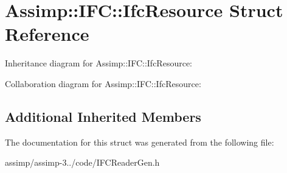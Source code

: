 \hypertarget{struct_assimp_1_1_i_f_c_1_1_ifc_resource}{\section{Assimp\+:\+:I\+F\+C\+:\+:Ifc\+Resource Struct Reference}
\label{struct_assimp_1_1_i_f_c_1_1_ifc_resource}
}


Inheritance diagram for Assimp\+:\+:I\+F\+C\+:\+:Ifc\+Resource\+:


Collaboration diagram for Assimp\+:\+:I\+F\+C\+:\+:Ifc\+Resource\+:
\subsection*{Additional Inherited Members}


The documentation for this struct was generated from the following file\+:\begin{DoxyCompactItemize}
\item 
assimp/assimp-\/3../code/I\+F\+C\+Reader\+Gen.\+h\end{DoxyCompactItemize}
